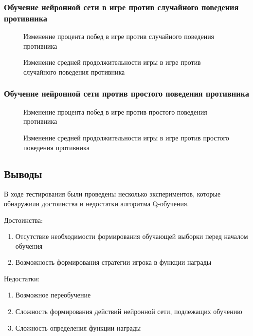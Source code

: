 \begin{Large}
\subsubsection*{\large{Обучение нейронной сети в игре против случайного поведения противника}}
\newpage
\begin{figure}[h!]
    \caption{Изменение процента побед в игре против случайного поведения противника}
\end{figure}
\begin{figure}[h!]
    \caption{Изменение средней продолжительности игры в игре против случайного поведения противника}
\end{figure}
\newpage
\subsubsection*{\large{Обучение нейронной сети против простого поведения противника}}
\begin{figure}[h!]
    \caption{Изменение процента побед в игре против простого поведения противника}
\end{figure}
\begin{figure}[h!]
    \caption{Изменение средней продолжительности игры в игре против простого поведения противника}
\end{figure}
\subsection*{Выводы}
В ходе тестирования были проведены несколько экспериментов, которые обнаружили достоинства и недостатки алгоритма Q-обучения. 

Достоинства:
\begin{spacing}{0.9}
\begin{enumerate}
    \item Отсутствие необходимости формирования обучающей выборки перед началом обучения
    \item Возможность формирования стратегии игрока в функции награды
\end{enumerate}
\end{spacing}

Недостатки:
\begin{spacing}{0.9}
\begin{enumerate}
    \item Возможное переобучение
    \item Сложность формирования действий нейронной сети, подлежащих обучению
    \item Сложность определения функции награды
\end{enumerate}
\end{spacing}


\end{Large}
